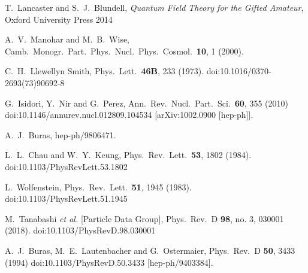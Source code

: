 \begin{thebibliography}{99}
  T.~Lancaster and S.~J.~Blundell,
  \textit{Quantum Field Theory for the Gifted Amateur},
  Oxford University Press 2014
  
  
  A.~V.~Manohar and M.~B.~Wise,
  Camb.\ Monogr.\ Part.\ Phys.\ Nucl.\ Phys.\ Cosmol.\  {\bf 10}, 1 (2000).
  
  
  C.~H.~Llewellyn Smith,
  Phys.\ Lett.\  {\bf 46B}, 233 (1973).
  doi:10.1016/0370-2693(73)90692-8
  
  G.~Isidori, Y.~Nir and G.~Perez,
  Ann.\ Rev.\ Nucl.\ Part.\ Sci.\  {\bf 60}, 355 (2010)
  doi:10.1146/annurev.nucl.012809.104534
  [arXiv:1002.0900 [hep-ph]].
  
  A.~J.~Buras,
  hep-ph/9806471.
  
  L.~L.~Chau and W.~Y.~Keung,
  Phys.\ Rev.\ Lett.\  {\bf 53}, 1802 (1984).
  doi:10.1103/PhysRevLett.53.1802
  
  L.~Wolfenstein,
  Phys.\ Rev.\ Lett.\  {\bf 51}, 1945 (1983).
  doi:10.1103/PhysRevLett.51.1945
  
  M.~Tanabashi {\it et al.} [Particle Data Group],
  Phys.\ Rev.\ D {\bf 98}, no. 3, 030001 (2018).
  doi:10.1103/PhysRevD.98.030001
  
  A.~J.~Buras, M.~E.~Lautenbacher and G.~Ostermaier,
  Phys.\ Rev.\ D {\bf 50}, 3433 (1994)
  doi:10.1103/PhysRevD.50.3433
  [hep-ph/9403384].
  

\end{thebibliography}
